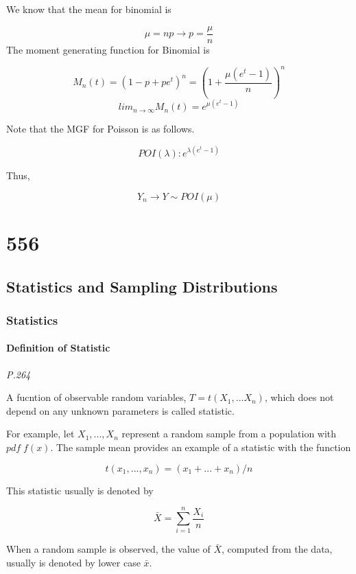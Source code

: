 \documentclass[]{book}
\begin{document}
We know that the mean for binomial is

\[\mu=np \rightarrow p=\frac{\mu}{n}\]
The moment generating function for Binomial is

\[M_n(t)=(1-p+pe^t)^n=(1+\frac{\mu (e^t-1)}{n})^n\]
\[lim_{n \rightarrow \infty} M_n(t)=e^{\mu (e^t-1)}\]

Note that the MGF for Poisson is as follows.

\[POI(\lambda): e^{\lambda(e^t-1)}\]

Thus,

\[Y_n \rightarrow Y \sim POI (\mu)\]

\hypertarget{section-1}{%
\chapter{556}\label{section-1}}

\hypertarget{statistics-and-sampling-distributions}{%
\section{Statistics and Sampling Distributions}\label{statistics-and-sampling-distributions}}

\hypertarget{statistics}{%
\subsection{Statistics}\label{statistics}}

\hypertarget{definition-of-statistic}{%
\subsubsection{Definition of Statistic}\label{definition-of-statistic}}

\emph{P.264}

A fucntion of observable random variables, \(T=t(X_1, ... X_n)\), which does not depend on any unknown parameters is called statistic.

For example, let \(X_1, ..., X_n\) represent a random sample from a population with \(pdf \;f(x)\). The sample mean provides an example of a statistic with the function

\[t(x_1,...,x_n)=(x_1+...+x_n)/n\]

This statistic usually is denoted by

\[\bar{X}=\sum_{i=1}^n \frac{X_i}{n}\]

When a random sample is observed, the value of \(\bar{X}\), computed from the data, usually is denoted by lower case \(\bar{x}\).
\end{document}

